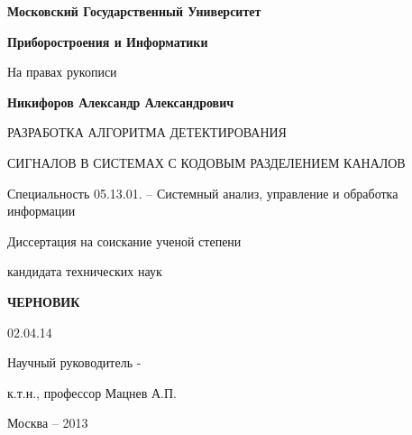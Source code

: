 \noindent\centerline{\bf{Московский Государственный Университет}}
\noindent\centerline{\bf{Приборостроения и Информатики}}
\vspace{\baselineskip}
\vspace{\baselineskip}

\hfill На правах рукописи

\vspace{\baselineskip}
\vspace{\baselineskip}

\noindent\centerline{\bf{Никифоров Александр Александрович}}

\vspace{\baselineskip}
\vspace{\baselineskip}

\noindent\centerline{РАЗРАБОТКА АЛГОРИТМА ДЕТЕКТИРОВАНИЯ}
\noindent\centerline{СИГНАЛОВ В СИСТЕМАХ С КОДОВЫМ РАЗДЕЛЕНИЕМ КАНАЛОВ}

\vspace{\baselineskip}
\vspace{\baselineskip}

\noindent\centerline{Специальность 05.13.01. – Системный анализ, управление и обработка информации}

\vspace{\baselineskip}
\vspace{\baselineskip}

\noindent\centerline{Диссертация на соискание ученой степени}
\noindent\centerline{кандидата технических наук}


\vspace{\baselineskip}
\vspace{\baselineskip}
\noindent\centerline{\bf{ЧЕРНОВИК}}
\noindent\centerline{02.04.14}

\vspace{\baselineskip}
\vspace{\baselineskip}

\hfill{Научный руководитель -}

\hfill{к.т.н., профессор Мацнев А.П.}

\vfill
\noindent\centerline{Москва – 2013}

\newpage
